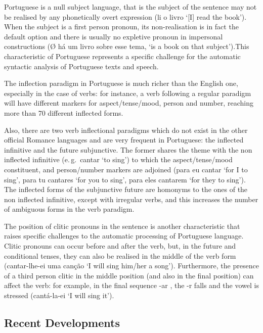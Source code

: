 \begin{multicols}{2}
Portuguese is a null subject language, that is the subject of the sentence may not be realised by any phonetically overt expression (li o livro ‘[I] read the book’). When the subject is a first person pronoun, its non-realisation is in fact the default option and there is usually no expletive pronoun in impersonal constructions (Ø há um livro sobre esse tema, ‘is a book on that subject’).This characteristic of Portuguese represents a specific challenge for the automatic syntactic analysis of Portuguese texts and speech.

The inflection paradigm in Portuguese is much richer than the English one, especially in the case of verbs: for instance, a verb following a regular paradigm will have different markers for aspect/tense/mood, person and number, reaching more than 70 different inflected forms.


Also, there are two verb inflectional paradigms which do not exist in the other official Romance languages and are very frequent in Portuguese: the inflected infinitive and the future subjunctive.  The former shares the theme with the non inflected infinitive (e.\,g.~cantar ‘to sing’) to which the aspect/tense/mood constituent, and person/number markers are adjoined (para eu cantar ‘for I to sing’, para tu cantares ‘for you to sing’, para eles cantarem ‘for they to sing’). The inflected forms of the subjunctive future are homonyms to the ones of the non inflected infinitive, except with irregular verbs, and this increases the number of ambiguous forms in the verb paradigm.

The position of clitic pronouns in the sentence is another characteristic that raises specific challenges to the automatic processing of Portuguese language. Clitic pronouns can occur before and after the verb, but, in the future and conditional tenses, they can also be realised in the middle of the verb form (cantar-lhe-ei uma canção ‘I will sing him/her a song’). Furthermore, the presence of a third person clitic in the middle position (and also in the final position) can affect the verb: for example, in the final sequence -ar , the -r falls and the vowel is stressed (cantá-la-ei ‘I will sing it’).

\subsection{Recent Developments}


\end{multicols}

